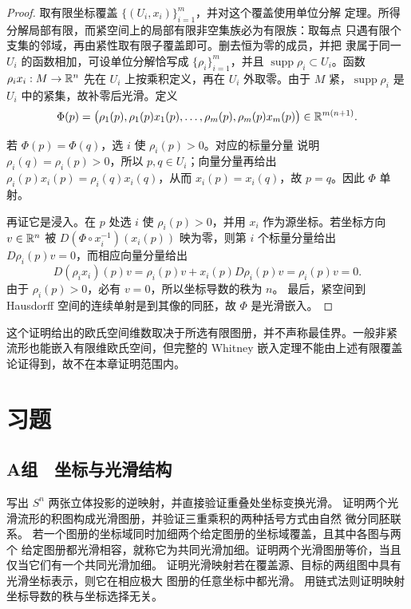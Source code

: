\begin{proof}
取有限坐标覆盖 \(\{(U_i,x_i)\}_{i=1}^m\)，并对这个覆盖使用单位分解
定理。所得分解局部有限，而紧空间上的局部有限非空集族必为有限族：取每点
只遇有限个支集的邻域，再由紧性取有限子覆盖即可。删去恒为零的成员，并把
隶属于同一 \(U_i\) 的函数相加，可设单位分解恰写成
\(\{\rho_i\}_{i=1}^m\)，并且
\(\operatorname{supp}\rho_i\subset U_i\)。函数
\(\rho_i x_i:M\to\mathbb{R}^n\) 先在 \(U_i\) 上按乘积定义，再在 \(U_i\)
外取零。由于 \(M\) 紧，\(\operatorname{supp}\rho_i\) 是 \(U_i\)
中的紧集，故补零后光滑。定义
\[
 \Phi(p)=
 \bigl(\rho_1(p),\rho_1(p)x_1(p),\ldots,
       \rho_m(p),\rho_m(p)x_m(p)\bigr)
 \in\mathbb{R}^{m(n+1)}.
\]

若 \(\Phi(p)=\Phi(q)\)，选 \(i\) 使 \(\rho_i(p)>0\)。对应的标量分量
说明 \(\rho_i(q)=\rho_i(p)>0\)，所以 \(p,q\in U_i\)；向量分量再给出
\(\rho_i(p)x_i(p)=\rho_i(q)x_i(q)\)，从而 \(x_i(p)=x_i(q)\)，故
\(p=q\)。因此 \(\Phi\) 单射。

再证它是浸入。在 \(p\) 处选 \(i\) 使 \(\rho_i(p)>0\)，并用 \(x_i\)
作为源坐标。若坐标方向 \(v\in\mathbb{R}^n\) 被
\(D(\Phi\circ x_i^{-1})(x_i(p))\) 映为零，则第 \(i\) 个标量分量给出
\(D\rho_i(p)v=0\)，而相应向量分量给出
\[
 D(\rho_i x_i)(p)v
 =\rho_i(p)v+x_i(p)D\rho_i(p)v
 =\rho_i(p)v=0.
\]
由于 \(\rho_i(p)>0\)，必有 \(v=0\)，所以坐标导数的秩为 \(n\)。
最后，紧空间到 Hausdorff 空间的连续单射是到其像的同胚，故 \(\Phi\)
是光滑嵌入。
\end{proof}

这个证明给出的欧氏空间维数取决于所选有限图册，并不声称最佳界。一般非紧
流形也能嵌入有限维欧氏空间，但完整的 Whitney 嵌入定理不能由上述有限覆盖
论证得到，故不在本章证明范围内。

\section*{习题}

\subsection*{A组　坐标与光滑结构}
\begin{enumerate}[label=\textbf{\thechapter.\arabic*.}]
 写出 \(S^n\) 两张立体投影的逆映射，并直接验证重叠处坐标变换光滑。
 证明两个光滑流形的积图构成光滑图册，并验证三重乘积的两种括号方式由自然
 微分同胚联系。
 若一个图册的坐标域同时加细两个给定图册的坐标域覆盖，且其中各图与两个
 给定图册都光滑相容，就称它为共同光滑加细。证明两个光滑图册等价，当且
 仅当它们有一个共同光滑加细。
 证明光滑映射若在覆盖源、目标的两组图中具有光滑坐标表示，则它在相应极大
 图册的任意坐标中都光滑。
 用链式法则证明映射坐标导数的秩与坐标选择无关。
\end{enumerate}

